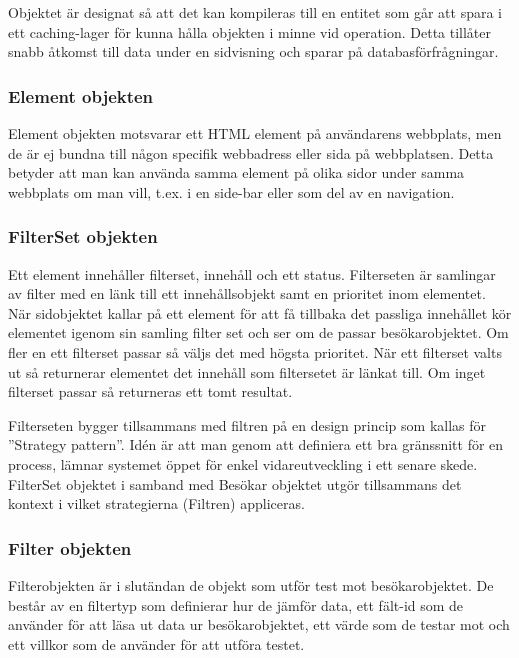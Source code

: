 Objektet är designat så att det kan kompileras till en entitet som går att spara i ett caching-lager för kunna hålla objekten i minne vid operation. Detta tillåter snabb åtkomst till data under en sidvisning och sparar på databasförfrågningar.

\subsubsection{Element objekten}



Element objekten motsvarar ett HTML element på användarens webbplats, men de är ej bundna till någon specifik webbadress eller sida på webbplatsen. Detta betyder att man kan använda samma element på olika sidor under samma webbplats om man vill, t.ex. i en side-bar eller som del av en navigation.

\subsubsection{FilterSet objekten}



Ett element innehåller filterset, innehåll och ett status. Filterseten är samlingar av filter med en länk till ett innehållsobjekt samt en prioritet inom elementet. När sidobjektet kallar på ett element för att få tillbaka det passliga innehållet kör elementet igenom sin samling filter set och ser om de passar besökarobjektet. Om fler en ett filterset passar så väljs det med högsta prioritet. När ett filterset valts ut så returnerar elementet det innehåll som filtersetet är länkat till. Om inget filterset passar så returneras ett tomt resultat.

Filterseten bygger tillsammans med filtren på en design princip som kallas för ''Strategy pattern''. Idén är att man genom att definiera ett bra gränssnitt för en process, lämnar systemet öppet för enkel vidareutveckling i ett senare skede. \citep[s. 349]{gof} FilterSet objektet i samband med Besökar objektet utgör tillsammans det kontext i vilket strategierna (Filtren) appliceras.

\subsubsection{Filter objekten}



Filterobjekten är i slutändan de objekt som utför test mot besökarobjektet. De består av en filtertyp som definierar hur de jämför data, ett fält-id som de använder för att läsa ut data ur besökarobjektet, ett värde som de testar mot och ett villkor som de använder för att utföra testet.

